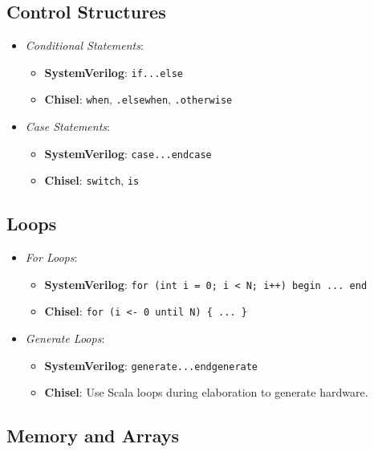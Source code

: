 \subsection{Control Structures}

\begin{itemize}
    \item \textit{Conditional Statements}:
        \begin{itemize}
            \item \textbf{SystemVerilog}: \texttt{if...else}
            \item \textbf{Chisel}: \texttt{when}, \texttt{.elsewhen}, \texttt{.otherwise}
        \end{itemize}
    \item \textit{Case Statements}:
        \begin{itemize}
            \item \textbf{SystemVerilog}: \texttt{case...endcase}
            \item \textbf{Chisel}: \texttt{switch}, \texttt{is}
        \end{itemize}
\end{itemize}

\subsection{Loops}

\begin{itemize}
    \item \textit{For Loops}:
        \begin{itemize}
            \item \textbf{SystemVerilog}: \texttt{for (int i = 0; i < N; i++) begin ... end}
            \item \textbf{Chisel}: \texttt{for (i <- 0 until N) \{ ... \}}
        \end{itemize}
    \item \textit{Generate Loops}:
        \begin{itemize}
            \item \textbf{SystemVerilog}: \texttt{generate...endgenerate}
            \item \textbf{Chisel}: Use Scala loops during elaboration to generate hardware.
        \end{itemize}
\end{itemize}

\subsection{Memory and Arrays}

